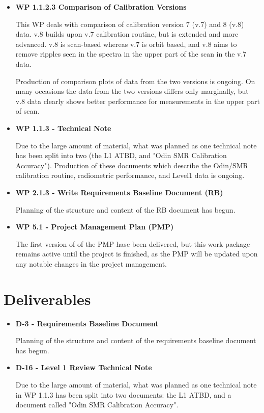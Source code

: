 \begin{itemize}
\item{\bf WP 1.1.2.3 Comparison of Calibration Versions}

This WP deals with comparison of calibration version 7 (v.7) and 8 (v.8) data. 
v.8 builds upon v.7 calibration routine, but is extended and more advanced.
v.8 is scan-based whereas v.7 is orbit based, and v.8 aims to remove ripples
seen in the spectra in the upper part of the scan in the v.7 data.

Production of comparison plots of data from the two versions is ongoing.
On many occasions the data from the two versions differs only marginally,
but v.8 data clearly shows better performance for measurements
in the upper part of scan.

\item{\bf WP 1.1.3 - Technical Note}

Due to the large amount of material, what was planned as one technical note has been split into two (the L1 ATBD, and "Odin SMR Calibration Accuracy"). Production of these documents which  describe the Odin/SMR calibration routine, radiometric performance, and Level1 data is ongoing.

\item{\bf WP 2.1.3 - Write Requirements Baseline Document (RB)}

Planning of the structure and content of the RB document has begun.

\item{\bf WP 5.1 - Project Management Plan (PMP)}

The first version of of the PMP hase been delivered, but this work package remains active until the project is finished, as the PMP will be updated upon any notable changes in the project management. 


\end{itemize}


\section{Deliverables}

\begin{itemize}

\item{\bf D-3 - Requirements Baseline Document}

Planning of the structure and content of the requirements baseline document has begun.

\item{\bf D-16 - Level 1 Review Technical Note}

Due to the large amount of material, what was planned as one technical note in WP 1.1.3 has been split into two documents: the L1 ATBD, and a document called "Odin SMR Calibration Accuracy". 
      

\end{itemize}
